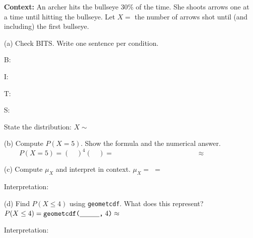 \documentclass[10pt]{article}
\begin{document}
\vspace{0.1in}

\begin{tcolorbox}[colback=sky, colframe=navy, boxrule=1pt, arc=2mm,
    title={\bfseries Tier A \quad Approaching Proficiency: Full Geometric Analysis},
    fonttitle=\small]
\small

\textbf{Context:} An archer hits the bullseye 30\% of the time. She shoots arrows
one at a time until hitting the bullseye.
Let $X =$ the number of arrows shot until (and including) the first bullseye.

\vspace{8pt}
(a) Check BITS. Write one sentence per condition.

\vspace{4pt}
B: \writeline

I: \writeline

T: \writeline

S: \writeline

\vspace{6pt}
State the distribution: $X \sim $ \blank{4cm}

\vspace{8pt}
(b) Compute $P(X = 5)$. Show the formula and the numerical answer.
\[
  P(X = 5) = (\quad)^{4}(\quad) = \hspace{5cm} \approx \hspace{2cm}
\]

\vspace{8pt}
(c) Compute $\mu_X$ and interpret in context.
\vspace{4pt}
$\mu_X = $ \blank{4cm} $= $ \blank{2cm}

\vspace{4pt}
Interpretation: \writeline\\[1pt]\writeline

\vspace{8pt}
(d) Find $P(X \le 4)$ using \texttt{geometcdf}. What does this represent?
\vspace{4pt}
$P(X \le 4) = \texttt{geometcdf(}\blank{1cm}\texttt{,}\;4\texttt{)} \approx $ \blank{2cm}

\vspace{4pt}
Interpretation: \writeline\\[1pt]\writeline
\vspace{4pt}
\end{tcolorbox}

\vspace{0.1in}
\end{document}
